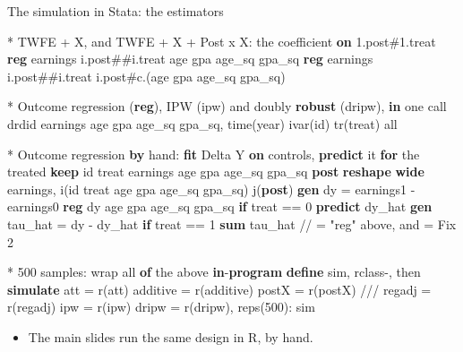 \documentclass[
  11pt,
  ignorenonframetext,
  aspectratio=169,
]{beamer}
\newenvironment{Shaded}{\begin{snugshade}}{\end{snugshade}}
\newcommand{\CommentTok}[1]{\textcolor[rgb]{0.37,0.37,0.37}{#1}}
\newcommand{\FunctionTok}[1]{\textcolor[rgb]{0.28,0.35,0.67}{#1}}
\newcommand{\KeywordTok}[1]{\textcolor[rgb]{0.00,0.23,0.31}{\textbf{#1}}}
\newcommand{\NormalTok}[1]{\textcolor[rgb]{0.00,0.23,0.31}{#1}}
\newcommand{\OtherTok}[1]{\textcolor[rgb]{0.00,0.23,0.31}{#1}}
\providecommand{\tightlist}{%
  \setlength{\itemsep}{0pt}\setlength{\parskip}{0pt}}
\begin{document}
\begin{frame}[fragile]{The simulation in Stata: the estimators}
\protect{}\label{the-simulation-in-stata-the-estimators}
\begin{Shaded}
\begin{Highlighting}[]
\NormalTok{* TWFE + X, and TWFE + X + Post x X: the coefficient }\KeywordTok{on}\NormalTok{ 1.post\#1.treat}
\KeywordTok{reg}\NormalTok{ earnings i.post\#\#i.treat age gpa age\_sq gpa\_sq}
\KeywordTok{reg}\NormalTok{ earnings i.post\#\#i.treat i.post\#c.(age gpa age\_sq gpa\_sq)}

\NormalTok{* Outcome regression (}\KeywordTok{reg}\NormalTok{), IPW (ipw) and doubly }\KeywordTok{robust}\NormalTok{ (dripw), }\KeywordTok{in}\NormalTok{ one call}
\NormalTok{drdid earnings age gpa age\_sq gpa\_sq, time(}\FunctionTok{year}\NormalTok{) ivar(id) tr(treat) }\OtherTok{all}

\NormalTok{* Outcome regression }\KeywordTok{by}\NormalTok{ hand: }\KeywordTok{fit}\NormalTok{ Delta Y }\KeywordTok{on}\NormalTok{ controls, }\KeywordTok{predict}\NormalTok{ it }\KeywordTok{for}\NormalTok{ the treated}
\KeywordTok{keep}\NormalTok{ id treat earnings age gpa age\_sq gpa\_sq }\KeywordTok{post}
\KeywordTok{reshape} \KeywordTok{wide}\NormalTok{ earnings, i(id treat age gpa age\_sq gpa\_sq) j(}\KeywordTok{post}\NormalTok{)}
\KeywordTok{gen}\NormalTok{ dy = earnings1 {-} earnings0}
\KeywordTok{reg}\NormalTok{ dy age gpa age\_sq gpa\_sq }\KeywordTok{if}\NormalTok{ treat == 0}
\KeywordTok{predict}\NormalTok{ dy\_hat}
\KeywordTok{gen}\NormalTok{ tau\_hat = dy {-} dy\_hat }\KeywordTok{if}\NormalTok{ treat == 1}
\KeywordTok{sum}\NormalTok{ tau\_hat                                     }\CommentTok{// = "reg" above, and = Fix 2}

\NormalTok{* 500 samples: wrap }\OtherTok{all} \KeywordTok{of}\NormalTok{ the above }\KeywordTok{in}\NormalTok{ {-}}\KeywordTok{program} \KeywordTok{define}\NormalTok{ sim, rclass{-}, then}
\KeywordTok{simulate}\NormalTok{ att = }\FunctionTok{r}\NormalTok{(att) additive = }\FunctionTok{r}\NormalTok{(additive) postX = }\FunctionTok{r}\NormalTok{(postX) }\CommentTok{///}
\NormalTok{         regadj = }\FunctionTok{r}\NormalTok{(regadj) ipw = }\FunctionTok{r}\NormalTok{(ipw) dripw = }\FunctionTok{r}\NormalTok{(dripw), reps(500): sim}
\end{Highlighting}
\end{Shaded}

\begin{itemize}
\tightlist
\item
  The main slides run the same design in R, by hand.
\end{itemize}
\end{frame}
\end{document}
